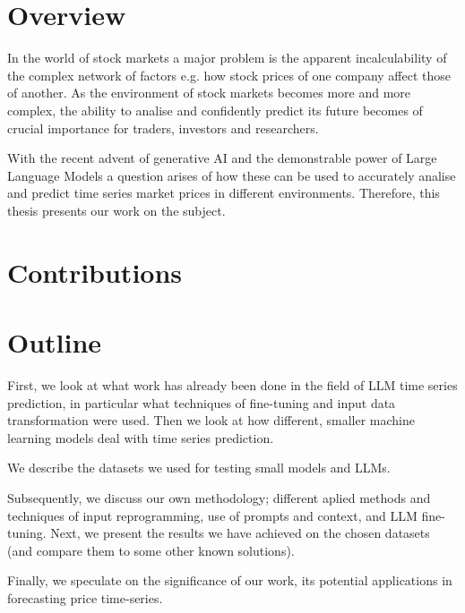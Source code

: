 \section{Overview}
In the world of stock markets a major problem is the apparent incalculability of the complex network of factors e.g. how stock prices of one company affect those of another. As the environment of stock markets becomes more and more complex, the ability to analise and confidently predict its future becomes of crucial importance for traders, investors and researchers.

With the recent advent of generative AI and the demonstrable power of Large Language Models a question arises of how these can be used to accurately analise and predict time series market prices in different environments. Therefore, this thesis presents our work on the subject.
\section{Contributions}
\section{Outline}
First, we look at what work has already been done in the field of LLM time series prediction, in particular what techniques of fine-tuning and input data transformation were used. Then we look at how different, smaller machine learning models deal with time series prediction.

We describe the datasets we used for testing small models and LLMs.

Subsequently, we discuss our own methodology; different aplied methods and techniques of input reprogramming, use of prompts and context, and LLM fine-tuning. Next, we present the results we have achieved on the chosen datasets (and compare them to some other known solutions).

Finally, we speculate on the significance of our work, its potential applications in forecasting price time-series.
